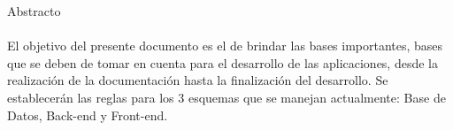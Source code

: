 \documentclass[a4paper, 10pt]{article}
\begin{document}
\clearpage

\begin{tcolorbox}[colback=white!5!white, colframe=lightGrey, boxrule=0.3mm, arc=0mm, boxsep=0mm, left=1mm, right=1mm, bottom=1mm, top=1mm]
	\begin{tcolorbox}[colback=backgroundGray, colframe=white, arc=0mm, fontupper=\color{textColor}\sffamily\bfseries]
		\large Abstracto\\\\
		\normalsize El objetivo del presente documento es el de brindar las bases importantes, bases que se deben de tomar en cuenta para el desarrollo de las aplicaciones, desde la realización de la documentación hasta la finalización del desarrollo. Se establecerán las reglas para los 3 esquemas que se manejan actualmente: Base de Datos, Back-end y Front-end.
	\end{tcolorbox}%
\end{tcolorbox}
\end{document}
